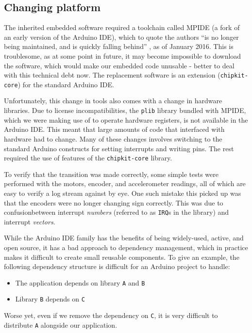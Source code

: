 \documentclass[main.tex]{subfiles}
\begin{document}
\subsection{Changing platform}
\label{sec:platformio}

	The inherited embedded software required a toolchain called MPIDE (a fork of an early version of the Arduino IDE), which to quote the authors \enquote{is no longer being maintained, and is quickly falling behind} \cite{ mpide}, as of January 2016. This is troublesome, as at some point in future, it may become impossible to download the software, which would make our embedded code unusable - better to deal with this technical debt now. The replacement software is an extension (\texttt{chipkit-core}) for the standard Arduino IDE.

	Unfortunately, this change in tools also comes with a change in hardware libraries.
	Due to license incompatibilities, the \texttt{plib} library bundled with MPIDE, which we were making use of to operate hardware registers, is not available in the Arduino IDE.
	This meant that large amounts of code that interfaced with hardware had to change. Many of these changes involves switching to the standard Arduino constructs for setting interrupts and writing pins.
	The rest required the use of features of the \texttt{chipkit-core} library.

	To verify that the transition was made correctly, some simple tests were performed with the motors, encoder, and accelerometer readings, all of which are easy to verify a log stream against by eye. One such mistake this picked up was that the encoders were no longer changing sign correctly.
	This was due to confusion\footnotemark between interrupt \emph{numbers} (referred to as \texttt{IRQ}s in the library) and interrupt \emph{vectors}.


	While the Arduino IDE family has the benefits of being widely-used, active, and open source, it has a bad approach to dependency management, which in practice makes it difficult to create small reusable components.
	To give an example, the following dependency structure is difficult for an Arduino project to handle:
	\begin{itemize}[noitemsep]
		\item The application depends on library \texttt{A} and \texttt{B}
		\item Library \texttt{B} depends on \texttt{C}
	\end{itemize}
	Worse yet, even if we remove the dependency on \texttt{C}, it is very difficult to distribute \texttt{A} alongside our application.
\end{document}
